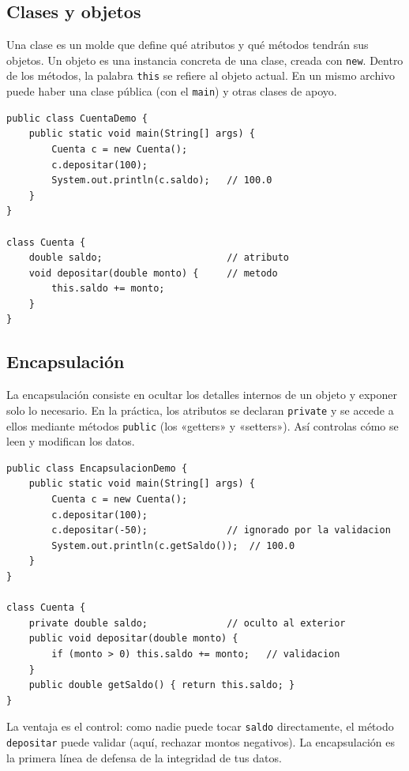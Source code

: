 \documentclass[11pt]{article}
\begin{document}
\subsection{Clases y objetos}
Una clase es un molde que define qué atributos y qué métodos tendrán sus objetos. Un objeto es una instancia concreta de una clase, creada con \texttt{new}. Dentro de los métodos, la palabra \texttt{this} se refiere al objeto actual. En un mismo archivo puede haber una clase pública (con el \texttt{main}) y otras clases de apoyo.

\begin{cajacodigo}
\begin{lstlisting}[style=java]
public class CuentaDemo {
    public static void main(String[] args) {
        Cuenta c = new Cuenta();
        c.depositar(100);
        System.out.println(c.saldo);   // 100.0
    }
}

class Cuenta {
    double saldo;                      // atributo
    void depositar(double monto) {     // metodo
        this.saldo += monto;
    }
}
\end{lstlisting}
\end{cajacodigo}
\vspace{2pt}
\subsection{Encapsulación}
La encapsulación consiste en ocultar los detalles internos de un objeto y exponer solo lo necesario. En la práctica, los atributos se declaran \texttt{private} y se accede a ellos mediante métodos \texttt{public} (los «getters» y «setters»). Así controlas cómo se leen y modifican los datos.

\begin{cajacodigo}
\begin{lstlisting}[style=java]
public class EncapsulacionDemo {
    public static void main(String[] args) {
        Cuenta c = new Cuenta();
        c.depositar(100);
        c.depositar(-50);              // ignorado por la validacion
        System.out.println(c.getSaldo());  // 100.0
    }
}

class Cuenta {
    private double saldo;              // oculto al exterior
    public void depositar(double monto) {
        if (monto > 0) this.saldo += monto;   // validacion
    }
    public double getSaldo() { return this.saldo; }
}
\end{lstlisting}
\end{cajacodigo}
\vspace{2pt}
La ventaja es el control: como nadie puede tocar \texttt{saldo} directamente, el método \texttt{depositar} puede validar (aquí, rechazar montos negativos). La encapsulación es la primera línea de defensa de la integridad de tus datos.
\end{document}

